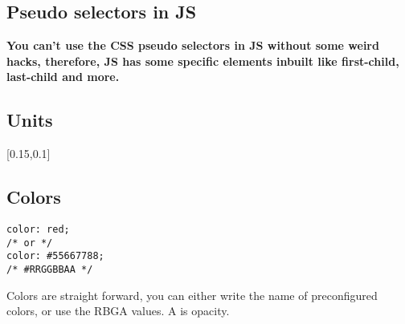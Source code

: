 \documentclass[main.tex,fontsize=6pt,paper=a4,paper=landscape,DIV=calc,]{scrartcl}
\begin{document}
\begin{multicols*}{4}
 \subsection{Pseudo selectors in JS}  
\textbf{You can't use the CSS pseudo selectors in JS without some weird hacks, therefore, JS has some specific elements inbuilt like first-child, last-child and more.}

\subsection{Units}
[0.15,0.1]

\subsection{Colors}

\vspace{-2mm}
\begin{lstlisting}
color: red;
/* or */
color: #55667788;
/* #RRGGBBAA */
\end{lstlisting}
\vspace{2mm}
Colors are straight forward, you can either write the name of preconfigured colors, or use the RBGA values. \newline A is opacity.


\end{multicols*}
\end{document}
